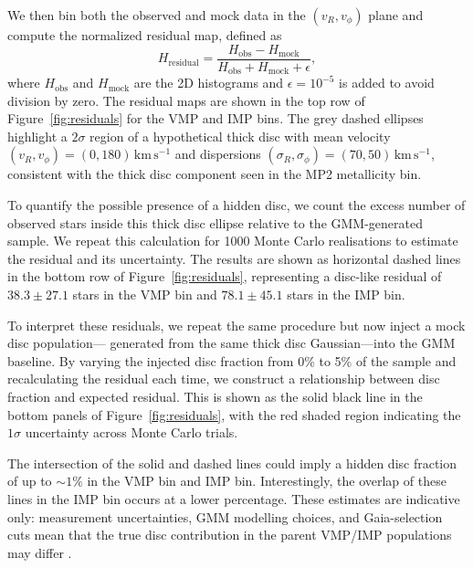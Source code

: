 \documentclass[a4paper,12pt]{article}
\begin{document}
We then bin both the observed and mock data in the $(v_R, v_\phi)$ plane and compute the 
normalized residual map, defined as
\[
H_{\mathrm{residual}} = \frac{H_{\mathrm{obs}} - H_{\mathrm{mock}}}{H_{\mathrm{obs}} + H_{\mathrm{mock}} + \epsilon},
\]
where $H_{\mathrm{obs}}$ and $H_{\mathrm{mock}}$ are the 2D histograms and $\epsilon = 10^{-5}$ is added 
to avoid division by zero. The residual maps are shown in the top row of Figure~\ref{fig:residuals} for 
the VMP and IMP bins. The grey dashed ellipses highlight a $2\sigma$ region of a hypothetical thick disc 
with mean velocity $(v_R, v_\phi) = (0, 180)\,\mathrm{km\,s^{-1}}$ and dispersions $(\sigma_R, \sigma_\phi) 
= (70, 50)\,\mathrm{km\,s^{-1}}$, consistent with the thick disc component seen in the MP2 metallicity bin.

To quantify the possible presence of a hidden disc, we count the excess number of observed stars inside 
this thick disc ellipse relative to the GMM-generated sample. We repeat this calculation for 1000 Monte 
Carlo realisations to estimate the residual and its uncertainty. The results are shown as horizontal 
dashed lines in the bottom row of Figure~\ref{fig:residuals}, representing a disc-like residual 
of $38.3 \pm 27.1$ stars in the VMP bin and $78.1 \pm 45.1$ stars in the IMP bin.

To interpret these residuals, we repeat the same procedure but now inject a mock disc population—
generated from the same thick disc Gaussian—into the GMM baseline. By varying the injected disc 
fraction from 0\% to 5\% of the sample and recalculating the residual each time, we construct a 
relationship between disc fraction and expected residual. This is shown as the solid black line in the 
bottom panels of Figure~\ref{fig:residuals}, with the red shaded region indicating the $1\sigma$ 
uncertainty across Monte Carlo trials.

The intersection of the solid and dashed lines could imply a hidden disc fraction 
of up to $\sim1\%$ in the VMP bin and IMP bin. Interestingly, the overlap of these lines in the IMP
bin occurs at a lower percentage. These estimates are indicative only: 
measurement uncertainties, GMM modelling choices, and Gaia-selection cuts mean that the true disc 
contribution in the parent VMP/IMP populations may differ \citep{zhang2024existencemetalpoordiscmilky}.  
\end{document}
